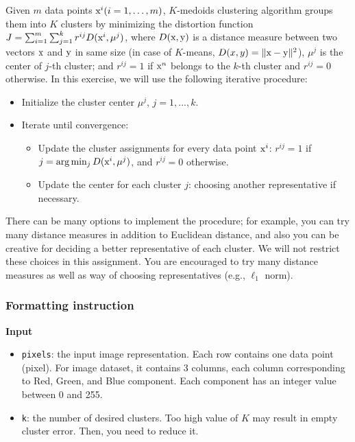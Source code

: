 \documentclass[twoside,10pt]{article}
\begin{document}
Given $m$ data points $\text x^i (i = 1, \ldots, m)$, $K$-medoids clustering algorithm groups them into $K$ clusters by minimizing the distortion function $J = \sum_{i=1}^m \sum_{j=1}^k r^{ij} D(\text x^i, \mu^j)$,
where $D(\text x, \text y)$ is a distance measure between two vectors $\text x$ and $\text y$ in same size (in case of $K$-means, $D(x, y) = \| \text x - \text y \|^2$), $\mu^j$ is the center of $j$-th cluster; and $r^{ij} = 1$ if $\text x^n$ belongs to the $k$-th cluster and $r^{ij} = 0$ otherwise. In this exercise, we will use the following iterative procedure:

\begin{itemize}
  \item Initialize the cluster center $\mu^j$, $j = 1, ..., k$.
  \item Iterate until convergence:
  \begin{itemize}
    \item Update the cluster assignments for every data point $\text x^i$: $r^{ij} = 1$ if $j = \arg\min_j D(\text x^i, \mu^j)$, and $r^{ij} = 0$ otherwise.
    \item Update the center for each cluster $j$: choosing another representative if necessary.
  \end{itemize}
\end{itemize}

There can be many options to implement the procedure; for example, you can try many distance measures in addition to Euclidean distance, and also you can be creative for deciding a better representative of each cluster. We will not restrict these choices in this assignment. You are encouraged to try many distance measures as well as way of choosing representatives (e.g., $\ell_1$ norm).

\subsubsection*{Formatting instruction}


\textbf{Input}
\begin{itemize}
  \item \texttt{pixels}: the input image representation. Each row contains one data point (pixel). For image dataset, it contains 3 columns, each column corresponding to Red, Green, and Blue component. Each component has an integer value between 0 and 255.
  \item \texttt{k}: the number of desired clusters. Too high value of $K$ may result in empty cluster error. Then, you need to reduce it.
\end{itemize}
\end{document}

